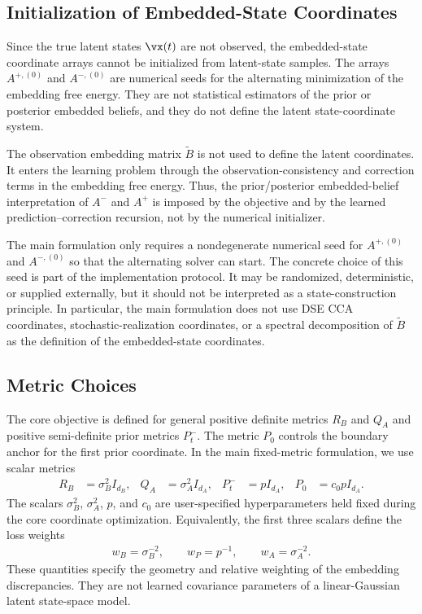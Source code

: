 \documentclass[twoside,11pt]{article}
\begin{document}
\subsection{Initialization of Embedded-State Coordinates}

Since the true latent states $\vx(t)$ are not observed, the
embedded-state coordinate arrays cannot be initialized from latent-state
samples. The arrays $A^{+,(0)}$ and $A^{-,(0)}$ are numerical seeds for
the alternating minimization of the embedding free energy. They are not
statistical estimators of the prior or posterior embedded beliefs, and
they do not define the latent state-coordinate system.

The observation embedding matrix $\tilde B$ is not used to define the
latent coordinates. It enters the learning problem through the
observation-consistency and correction terms in the embedding free
energy. Thus, the prior/posterior embedded-belief interpretation of
$A^-$ and $A^+$ is imposed by the objective and by the learned
prediction--correction recursion, not by the numerical initializer.

The main formulation only requires a nondegenerate numerical seed for
$A^{+,(0)}$ and $A^{-,(0)}$ so that the alternating solver can start.
The concrete choice of this seed is part of the implementation protocol.
It may be randomized, deterministic, or supplied externally, but it
should not be interpreted as a state-construction principle. In
particular, the main formulation does not use DSE CCA coordinates,
stochastic-realization coordinates, or a spectral decomposition of
$\tilde B$ as the definition of the embedded-state coordinates.

\subsection{Metric Choices}

The core objective is defined for general positive definite metrics
$R_B$ and $Q_A$ and positive semi-definite prior metrics $P_t^-$. The
metric $P_0$ controls the boundary anchor for the first prior
coordinate. In the main fixed-metric formulation, we use scalar metrics
\begin{align}
R_B
&=
\sigma_B^2 I_{d_B},
&
Q_A
&=
\sigma_A^2 I_{d_A},
&
P_t^-
&=
p I_{d_A},
&
P_0
&=
c_0p I_{d_A}.
\label{eq:core_fixed_metrics}
\end{align}
The scalars $\sigma_B^2$, $\sigma_A^2$, $p$, and $c_0$ are
user-specified hyperparameters held fixed during the core coordinate
optimization. Equivalently, the first three scalars define the loss
weights
\begin{align}
w_B
=
\sigma_B^{-2},
\qquad
w_P
=
p^{-1},
\qquad
w_A
=
\sigma_A^{-2}.
\label{eq:core_loss_weights}
\end{align}
These quantities specify the geometry and relative weighting of the
embedding discrepancies. They are not learned covariance parameters of
a linear-Gaussian latent state-space model.
\end{document}
